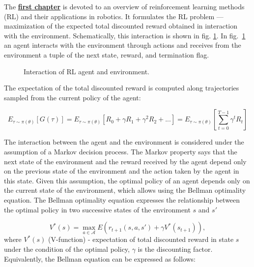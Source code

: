 The \underline{\textbf{first chapter}} is devoted to an overview of reinforcement learning methods (RL) and their applications in robotics. It formulates the RL problem --- maximization of the expected total discounted reward obtained in interaction with the environment. Schematically, this interaction is shown in fig. \ref{fig:rl_setting}. In fig.~\ref{fig:rl_setting} an agent interacts with the environment through actions and receives from the environment a tuple of the next state, reward, and termination flag. 

\begin{figure}[ht]
    \caption{Interaction of RL agent and environment.}\label{fig:rl_setting}
\end{figure}

The expectation of the total discounted reward is computed along trajectories sampled from the current policy of the agent:

\[
E_{\tau \sim \pi(\theta)} [G(\tau)] = E_{\tau \sim \pi(\theta)} [R_0 + \gamma R_{1} + \gamma ^ 2 R_{2} + ...] = E_{\tau \sim \pi(\theta)} [\sum_{t=0}^{T - 1} \gamma ^t R_{t}]
\]

The interaction between the agent and the environment is considered under the assumption of a Markov decision process. The Markov property says that the next state of the environment and the reward received by the agent depend only on the previous state of the environment and the action taken by the agent in this state. Given this assumption, the optimal policy of an agent depends only on the current state of the environment, which allows using the Bellman optimality equation. The Bellman optimality equation expresses the relationship between the optimal policy in two successive states of the environment $s$ and $s'$

\[
	V^*(s) = \max_{a \in \mathcal{A}} E(r_{t + 1}(s, a, s') + \gamma V^*(s_{t + 1})),
\]
where $V^*(s)$ (V-function) - expectation of total discounted reward in state $s$ under the condition of the optimal policy, $\gamma$ is the discounting factor. Equivalently, the Bellman equation can be expressed as follows: 

